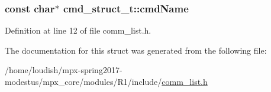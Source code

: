 \subsubsection[{\texorpdfstring{cmd\+Name}{cmdName}}]{\setlength{\rightskip}{0pt plus 5cm}const char$\ast$ cmd\+\_\+struct\+\_\+t\+::cmd\+Name}\hypertarget{structs__cmd__struct_ad0c669ee8a2f89742a5b4e4e88123865}{}\label{structs__cmd__struct_ad0c669ee8a2f89742a5b4e4e88123865}


Definition at line 12 of file comm\+\_\+list.\+h.



The documentation for this struct was generated from the following file\+:\begin{DoxyCompactItemize}
\item 
/home/loudish/mpx-\/spring2017-\/modestus/mpx\+\_\+core/modules/\+R1/include/\hyperlink{comm__list_8h}{comm\+\_\+list.\+h}\end{DoxyCompactItemize}
